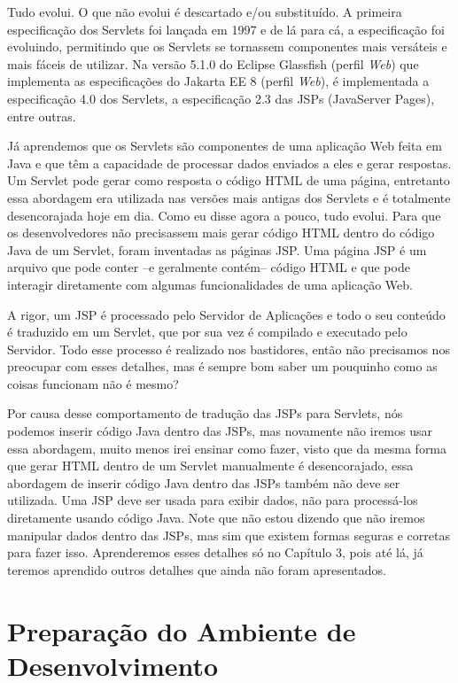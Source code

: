 Tudo evolui. O que não evolui é descartado e/ou substituído. A primeira especificação dos Servlets foi lançada em 1997 e de lá para cá, a especificação foi evoluindo, permitindo que os Servlets se tornassem componentes mais versáteis e mais fáceis de utilizar. Na versão 5.1.0 do Eclipse Glassfish (perfil \textit{Web}) que implementa as especificações do Jakarta EE 8 (perfil \textit{Web}), é implementada a especificação 4.0 dos Servlets, a especificação 2.3 das JSPs (JavaServer Pages), entre outras.

Já aprendemos que os Servlets são componentes de uma aplicação Web feita em Java e que têm a capacidade de processar dados enviados a eles e gerar respostas. Um Servlet pode gerar como resposta o código HTML de uma página, entretanto essa abordagem era utilizada nas versões mais antigas dos Servlets e é totalmente desencorajada hoje em dia. Como eu disse agora a pouco, tudo evolui. Para que os desenvolvedores não precisassem mais gerar código HTML dentro do código Java de um Servlet, foram inventadas as páginas JSP. Uma página JSP é um arquivo que pode conter –e geralmente contém– código HTML e que pode interagir diretamente com algumas funcionalidades de uma aplicação Web.

A rigor, um JSP é processado pelo Servidor de Aplicações e todo o seu conteúdo é traduzido em um Servlet, que por sua vez é compilado e executado pelo Servidor. Todo esse processo é realizado nos bastidores, então não precisamos nos preocupar com esses detalhes, mas é sempre bom saber um pouquinho como as coisas funcionam não é mesmo?

Por causa desse comportamento de tradução das JSPs para Servlets, nós podemos inserir código Java dentro das JSPs, mas novamente não iremos usar essa abordagem, muito menos irei ensinar como fazer, visto que da mesma forma que gerar HTML dentro de um Servlet manualmente é desencorajado, essa abordagem de inserir código Java dentro das JSPs também não deve ser utilizada. Uma JSP deve ser usada para exibir dados, não para processá-los diretamente usando código Java. Note que não estou dizendo que não iremos manipular dados dentro das JSPs, mas sim que existem formas seguras e corretas para fazer isso. Aprenderemos esses detalhes só no Capítulo 3, pois até lá, já teremos aprendido outros detalhes que ainda não foram apresentados.


\section{Preparação do Ambiente de Desenvolvimento}


